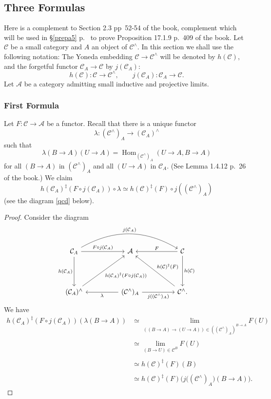\documentclass[12pt]{article}
\theoremstyle{remark}
\theoremstyle{definition}
\newcommand{\A}{\mathcal A}
\newcommand{\C}{\mathcal C}
\DeclareMathOperator{\Hom}{Hom}
\begin{document}

\subsection{Three Formulas}

Here is a complement to Section 2.3 pp~52-54 of the book, complement which will be used in \S\ref{prepa5} p.~\pageref{prepa5} to prove Proposition 17.1.9 p.~409 of the book. Let $\C$ be a small category and $A$ an object of $\C^\wedge$. In this section we shall use the following notation: The Yoneda embedding $\C\to\C^\wedge$ will be denoted by $h(\C)$, and the forgetful functor $\C_A\to\C$ by $j(\C_A)$: 
$$
h(\C):\C\to\C^\wedge,\qquad j(\C_A):\C_A\to\C.
$$
Let $\A$ be a category admitting small inductive and projective limits. 

\subsubsection{First Formula}

Let $F:\C\to\A$ be a functor. Recall that there is a unique functor 
$$
\lambda:(\C^\wedge)_A\to(\C_A)^\wedge
$$ 
such that 
%
\begin{equation}\label{lambda}
\lambda(B\to A)(U\to A)=\Hom_{(\C^\wedge)_A}(U\to A,B\to A)
\end{equation} 
%
for all $(B\to A)$ in $(\C^\wedge)_A$ and all $(U\to A)$ in $\C_A$. (See Lemma 1.4.12 p.~26 of the book.) We claim 
%
\begin{equation}\label{prepa1}
h(\C_A)^\ddagger(F\circ j(\C_A))\circ\lambda\simeq h(\C)^\ddagger(F)\circ j((\C^\wedge)_A)
\end{equation}
%
(see the diagram \eqref{qcd} below).

\begin{proof} 
Consider the diagram 
%
\begin{equation}\label{qcd}
\begin{tikzcd}
\C_A\ar[bend left]{rrrr}{j(\C_A)}\ar{rr}{F\circ j(\C_A)}\ar{dd}[swap]{h(\C_A)}&&\A&&\C\ar{ll}[swap]{F}\ar{dd}{h(\C)}\\ 
{}\\ 
(\C_A)^\wedge\ar{uurr}[swap]{h(\C_A)^\ddagger(F\circ j(\C_A))}&&(\C^\wedge)_A\ar{ll}{\lambda}\ar{rr}[swap]{j((\C^\wedge)_A)}&&\C^\wedge.\ar{uull}[swap]{h(\C)^\ddagger(F)}
\end{tikzcd}
\end{equation}
%
We have 
%
\begin{align*} 
%
h(\C_A)^\ddagger(F\circ j(\C_A))(\lambda(B\to A))&\simeq\lim_{((B\to A)\to(U\to A))\in((\C^\wedge)_A)^{B\to A}}F(U)\\ \\ 
%
&\simeq\lim_{(B\to U)\in\C^B}F(U)\\ \\ 
%
&\simeq h(\C)^\ddagger(F)(B)\\ \\ 
%
&\simeq h(\C)^\ddagger(F)\Big(j\big((\C^\wedge)_A\big)(B\to A)\Big). 
% 
\end{align*} 
\end{proof}
\end{document}
